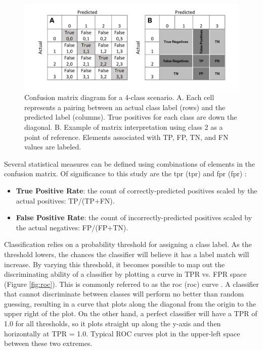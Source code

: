 \begin{figure}[!htp]
\centering
\includegraphics[width=\textwidth]{templates/images/Figure-Confusion_Matrix.png}
\caption[Four-class confusion matrix]{Confusion matrix diagram for a 4-class scenario. A. Each cell represents a pairing between an actual class label (rows) and the predicted label (columns). True positives for each class are down the diagonal. B. Example of matrix interpretation using class 2 as a point of reference. Elements associated with TP, FP, TN, and FN values are labeled.}
\label{fig:confusion_matrix}
\end{figure}

Several statistical measures can be defined using combinations of elements in the confusion matrix. Of significance to this study are the \acrlong{tpr} (\acrshort{tpr}) and \acrlong{fpr} (\acrshort{fpr}) \citep{tharwat_classification_2020}:

\begin{itemize}[itemsep=2pt]
\item \textbf{True Positive Rate}: the count of correctly-predicted positives scaled by the actual positives: TP/(TP$+$FN).
\item \textbf{False Positive Rate}: the count of incorrectly-predicted positives scaled by the actual negatives: FP/(FP$+$TN).
\end{itemize}

Classification relies on a probability threshold for assigning a class label. As the threshold lowers, the chances the classifier will believe it has a label match will increase. By varying this threshold, it becomes possible to map out the discriminating ability of a classifier by plotting a curve in TPR vs. FPR space (Figure \ref{fig:roc}). This is commonly referred to as the \acrlong{roc} (\acrshort{roc}) curve \citep{fawcett_introduction_2006}. A classifier that cannot discriminate between classes will perform no better than random guessing, resulting in a curve that plots along the diagonal from the origin to the upper right of the plot. On the other hand, a perfect classifier will have a TPR of 1.0 for all thresholds, so it plots straight up along the y-axis and then horizontally at TPR = 1.0. Typical ROC curves plot in the upper-left space between these two extremes.

